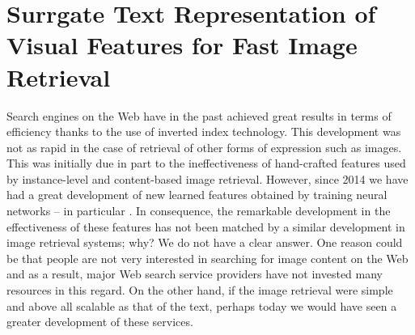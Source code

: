 
\renewcommand{\D}{\mathcal{X}} %
\renewcommand{\N}{{D}} %
\renewcommand{\bb}[1]{\boldsymbol {#1}} %
\renewcommand{\muu}{\bb{\mu}}

\graphicspath{{img/str/}}

\chapter{Surrgate Text Representation of Visual Features for Fast Image Retrieval}
\label{ch:surrogate}


Search engines on the Web have in the past achieved great results in terms of efficiency thanks to the use of inverted index technology.
This development was not as rapid in the case of retrieval of other forms of expression such as images.
This was initially due in part to the ineffectiveness of hand-crafted features used by instance-level and content-based image retrieval.
However, since 2014 we have had a great development of new learned features obtained by training neural networks -- in particular .
In consequence, the remarkable development in the effectiveness of these features has not been matched by a similar development in image retrieval systems; why?
We do not have a clear answer.
One reason could be that people are not very interested in searching for image content on the Web and as a result, major Web search service providers have not invested many resources in this regard.
On the other hand, if the image retrieval were simple and above all scalable as that of the text, perhaps today we would have seen a greater development of these services.

